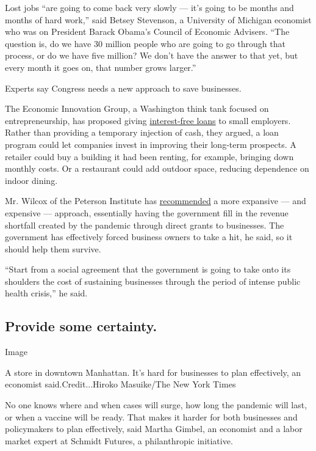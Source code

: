 Lost jobs ``are going to come back very slowly --- it's going to be
months and months of hard work,'' said Betsey Stevenson, a University of
Michigan economist who was on President Barack Obama's Council of
Economic Advisers. ``The question is, do we have 30 million people who
are going to go through that process, or do we have five million? We
don't have the answer to that yet, but every month it goes on, that
number grows larger.''

Experts say Congress needs a new approach to save businesses.

The Economic Innovation Group, a Washington think tank focused on
entrepreneurship, has proposed giving
\href{https://eig.org/news/main-street-rescue-and-resiliency-program}{interest-free
loans} to small employers. Rather than providing a temporary injection
of cash, they argued, a loan program could let companies invest in
improving their long-term prospects. A retailer could buy a building it
had been renting, for example, bringing down monthly costs. Or a
restaurant could add outdoor space, reducing dependence on indoor
dining.

Mr. Wilcox of the Peterson Institute has
\href{https://thehill.com/opinion/finance/493656-unclogging-the-financial-pipeline-to-us-workers-and-businesses}{recommended}
a more expansive --- and expensive --- approach, essentially having the
government fill in the revenue shortfall created by the pandemic through
direct grants to businesses. The government has effectively forced
business owners to take a hit, he said, so it should help them survive.

``Start from a social agreement that the government is going to take
onto its shoulders the cost of sustaining businesses through the period
of intense public health crisis,'' he said.

\hypertarget{provide-some-certainty}{%
\subsection{Provide some certainty.}\label{provide-some-certainty}}

Image

A store in downtown Manhattan. It's hard for businesses to plan
effectively, an economist said.Credit...Hiroko Masuike/The New York
Times

No one knows where and when cases will surge, how long the pandemic will
last, or when a vaccine will be ready. That makes it harder for both
businesses and policymakers to plan effectively, said Martha Gimbel, an
economist and a labor market expert at Schmidt Futures, a philanthropic
initiative.

